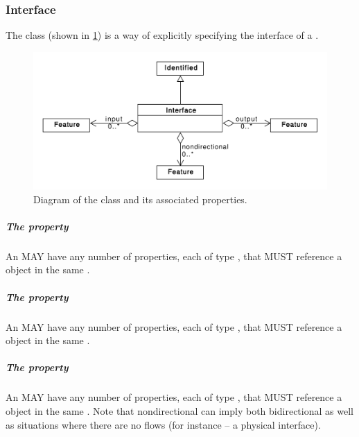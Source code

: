 
\subsubsection{Interface}
\label{sec:Interface}

The  class (shown in \ref{uml:interface}) is a way of explicitly specifying the interface of a . 

\begin{figure}[ht]
\begin{center}
\includegraphics[scale=0.6]{uml/interface}
\caption[]{Diagram of the  class and its associated properties.}
\label{uml:interface}
\end{center}
\end{figure}

\subparagraph{The  property}
\label{sec:input}

An  MAY have any number of  properties, each of type , that MUST reference a  object in the same .

\subparagraph{The  property}
\label{sec:output}

An  MAY have any number of  properties, each of type , that MUST reference a  object in the same .

\subparagraph{The  property}
\label{sec:nondirectional}

An  MAY have any number of  properties, each of type , that MUST reference a  object in the same . Note that nondirectional can imply both bidirectional as well as situations where there are no flows (for instance -- a physical interface).
